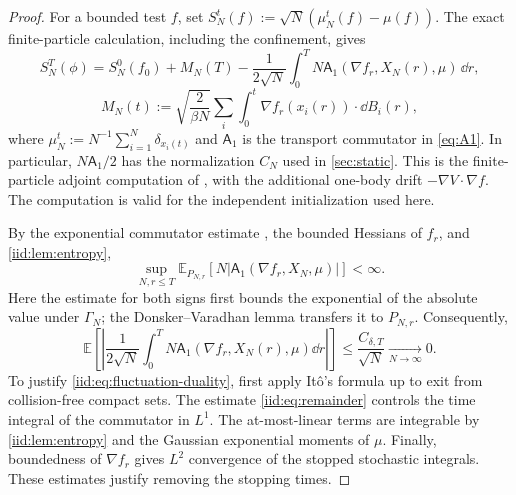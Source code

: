 \documentclass[11pt,reqno]{amsart}
\numberwithin{equation}{section}
\theoremstyle{plain}
\theoremstyle{remark}
\newcommand{\E}{\mathbb E}\newcommand{\Q}{\mathbb Q}\newcommand{\Pb}{\mathbb P}
\begin{document}
\begin{proof}
For a bounded test $f$, set $S_N^t(f):=\sqrt N(\mu_N^t(f)-\mu(f))$. The exact finite-particle calculation, including the confinement, gives
\begin{equation}\label{iid:eq:fluctuation-duality}
 S_N^T(\phi)=S_N^0(f_0)+M_N(T)-\frac1{2\sqrt N}
 \int_0^T N\mathsf A_1(\nabla f_r,X_N(r),\mu)\,\dd r,
\end{equation}
\begin{equation}\label{iid:eq:martingale}
 M_N(t):=\sqrt{\frac{2}{\beta N}}\sum_i\int_0^t\nabla f_r(x_i(r))\cdot\dd B_i(r),
\end{equation}
where $\mu_N^t:=N^{-1}\sum_{i=1}^N\delta_{x_i(t)}$ and $\mathsf A_1$ is the transport commutator in \eqref{eq:A1}. In particular, $N\mathsf A_1/2$ has the normalization $C_N$ used in \cref{sec:static}. This is the finite-particle adjoint computation of \cite[Proposition~8.2]{DGRpartition}, with the additional one-body drift $-\nabla V\cdot\nabla f$. The computation is valid for the independent initialization used here.

By the exponential commutator estimate \cite[Theorem~2.8]{DGRpartition}, the bounded Hessians of $f_r$, and \cref{iid:lem:entropy},
\begin{equation}\label{iid:eq:remainder}
 \sup_{N,r\le T}\E_{P_{N,r}}[N|\mathsf A_1(\nabla f_r,X_N,\mu)|]<\infty.
\end{equation}
Here the estimate for both signs first bounds the exponential of the absolute value under $\Gamma_N$; the Donsker--Varadhan lemma transfers it to $P_{N,r}$. Consequently,
\begin{equation}\label{iid:eq:remainder-limit}
 \E\left[\left|\frac1{2\sqrt N}\int_0^T
 N\mathsf A_1(\nabla f_r,X_N(r),\mu)\dd r\right|\right]
 \le\frac{C_{\delta,T}}{\sqrt N}\xrightarrow[N\to\infty]{}0.
\end{equation}
To justify \eqref{iid:eq:fluctuation-duality}, first apply It\^o's formula up to exit from collision-free compact sets. The estimate \eqref{iid:eq:remainder} controls the time integral of the commutator in $L^1$. The at-most-linear terms are integrable by \cref{iid:lem:entropy} and the Gaussian exponential moments of $\mu$. Finally, boundedness of $\nabla f_r$ gives $L^2$ convergence of the stopped stochastic integrals. These estimates justify removing the stopping times.


\end{proof}
\end{document}
